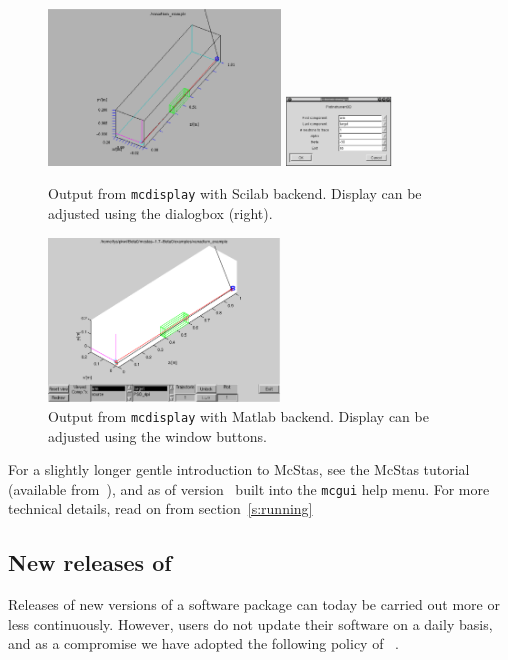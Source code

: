 \begin{figure}[htb!]
  \begin{center}
    \includegraphics[width=0.55\textwidth]{figures/mcdisplay_Scilab.ps}
    \includegraphics[width=0.25\textwidth]{figures/mcdisplay_Scilab_dialog.ps}
  \end{center}
\caption{Output from \texttt{mcdisplay} with Scilab backend. Display
  can be adjusted using the dialogbox (right).}
\label{fig:mcdisp_Scilab}
\end{figure}
\begin{figure}[htb!]
  \begin{center}
    \includegraphics[width=0.55\textwidth]{figures/mcdisplay_Matlab.eps}
  \end{center}
\caption{Output from \texttt{mcdisplay} with Matlab backend. Display
  can be adjusted using the window buttons.}
\label{fig:mcdisp_Matlab}
\end{figure}

For a slightly longer gentle introduction to McStas, see the McStas
tutorial (available from~\cite{mcstas_webpage}), and as of version
\version\ built into the \verb+mcgui+ help menu. For more technical
details, read on from section~\ref{s:running}

\subsection{New releases of \MCS}
Releases of new versions of a software package can today be carried out more or less
continuously. However, users do not update their software on a daily basis,
and as a compromise we have adopted the following policy of \MCS\ .

